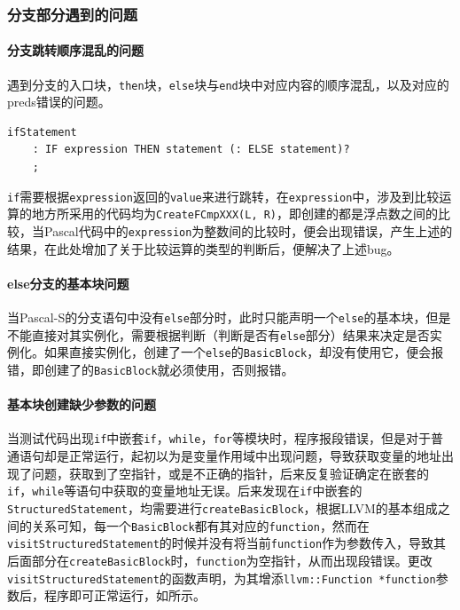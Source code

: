 \documentclass[lang=cn,11pt,a4paper,cite=authornum]{paper}
\begin{document}
\subsubsection{分支部分遇到的问题}

\paragraph{分支跳转顺序混乱的问题}

遇到分支的入口块，\texttt{then}块，\texttt{else}块与\texttt{end}块中对应内容的顺序混乱，以及对应的preds错误的问题。

\begin{code}
    \begin{verbatim}
ifStatement
    : IF expression THEN statement (: ELSE statement)?
    ;
\end{verbatim}
\end{code}

\texttt{if}需要根据\texttt{expression}返回的\texttt{value}来进行跳转，在\texttt{expression}中，涉及到比较运算的地方所采用的代码均为\texttt{CreateFCmpXXX(L, R)}，即创建的都是浮点数之间的比较，当Pascal代码中的\texttt{expression}为整数间的比较时，便会出现错误，产生上述的结果，在此处增加了关于比较运算的类型的判断后，便解决了上述bug。

\paragraph{else分支的基本块问题}

当Pascal-S的分支语句中没有\texttt{else}部分时，此时只能声明一个\texttt{else}的基本块，但是不能直接对其实例化，需要根据判断（判断是否有\texttt{else}部分）结果来决定是否实例化。如果直接实例化，创建了一个\texttt{else}的\texttt{BasicBlock}，却没有使用它，便会报错，即创建了的\texttt{BasicBlock}就必须使用，否则报错。

\paragraph{基本块创建缺少参数的问题}

当测试代码出现\texttt{if}中嵌套\texttt{if}，\texttt{while}，\texttt{for}等模块时，程序报段错误，但是对于普通语句却是正常运行，起初以为是变量作用域中出现问题，导致获取变量的地址出现了问题，获取到了空指针，或是不正确的指针，后来反复验证确定在嵌套的\texttt{if}，\texttt{while}等语句中获取的变量地址无误。后来发现在\texttt{if}中嵌套的\texttt{StructuredStatement}，均需要进行\texttt{createBasicBlock}，根据LLVM的基本组成之间的关系可知，每一个\texttt{BasicBlock}都有其对应的\texttt{function}，然而在\texttt{visitStructuredStatement}的时候并没有将当前\texttt{function}作为参数传入，导致其后面部分在\texttt{createBasicBlock}时，\texttt{function}为空指针，从而出现段错误。更改\texttt{visitStructuredStatement}的函数声明，为其增添\texttt{llvm::Function *function}参数后，程序即可正常运行，如所示。
\end{document}
